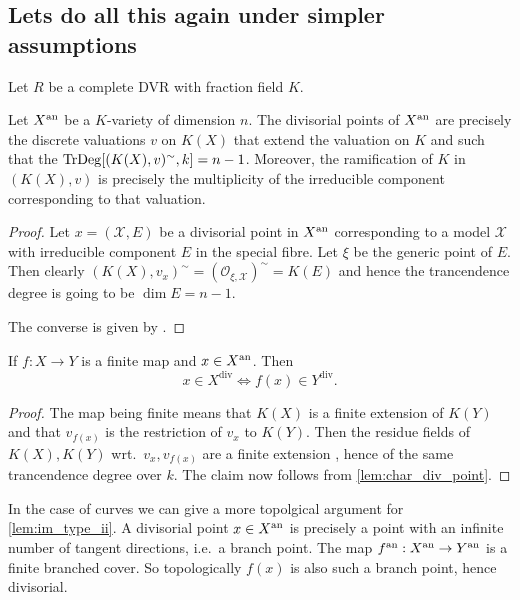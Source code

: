 \subsection{Lets do all this again under simpler assumptions} \label{sec:lets_do_all_this_again_under_simpler_assumptions}

Let $R$ be a complete DVR with fraction field $K$. 

\begin{lemma}\label{lem:char_div_point}
	Let $X{}^{\text{an}}$ be a $K$-variety of dimension $n$. 
	The divisorial points of $X{}^{\text{an}}$ are precisely the discrete valuations $v$ on $K(X)$ that extend the valuation on $K$ and such that the $\operatorname{TrDeg} [(K(X),v)^{\sim}, k] = n-1$.
	Moreover, the ramification of $K$ in $(K(X), v)$ is precisely the multiplicity of the irreducible component corresponding to that valuation.
\end{lemma}
\begin{proof}
	Let $x = (\mathscr X, E)$ be a divisorial point in $X{}^{\text{an}}$ corresponding to a model $\mathscr X$ with irreducible component $E$ in the special fibre.
	Let $\xi$ be the generic point of $E$. 
	Then clearly $(K(X), v_x)^{\sim} = (\mathcal{O}_{\xi, \mathscr X})^{\sim} = K(E)$ and hence the trancendence degree is going to be  $\dim E = n-1$.

	The converse is given by \cite[lem 2.45]{kollarBirationalGeometryAlgebraic1998}. 
\end{proof}
\begin{lemma}\label{lem:im_type_ii}
	If $f: X \to Y$ is a finite map and $x \in X{}^{\text{an}}$. Then
	\[
		x \in X^\text{div} \iff f(x) \in Y^\text{div}
	.\] 
\end{lemma}
\begin{proof}
	The map being finite means that $K(X)$ is a finite extension of $K(Y)$ and that $v_{f(x)}$ is the restriction of $v_x$ to $K(Y)$. 
	Then the residue fields of $K(X), K(Y)$ wrt.\ $v_x, v_{f(x)}$ are a finite extension , hence of the same trancendence degree over $k$. 
	The claim now follows from \cref{lem:char_div_point}.
\end{proof}
\begin{remark}
	In the case of curves we can give a more topolgical argument for \cref{lem:im_type_ii}. 
	A divisorial point $x \in X{}^{\text{an}}$ is precisely a point with an infinite number of tangent directions, i.e.\ a branch point.
	The map $f{}^{\text{an}}: X{}^{\text{an}} \to Y{}^{\text{an}} $ is a finite branched cover. So topologically $f(x)$ is also such a branch point, hence divisorial. 	
\end{remark}


